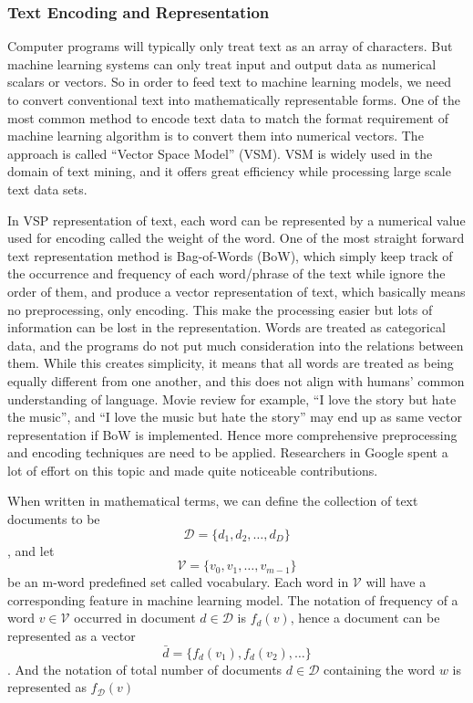 \documentclass[conference]{IEEEtran}
\begin{document}
\subsubsection{Text Encoding and Representation}
\label{model:represent:encoding}
    Computer programs will typically only treat text as an array of characters.
    But machine learning systems can only treat input and output data as numerical
    scalars or vectors. So in order to feed text to machine learning models, we need to 
    convert conventional text into mathematically representable forms. One of the most
    common method to encode text data to match the format requirement of machine
    learning algorithm is to convert them into numerical vectors. The approach is called
    ``Vector Space Model'' (VSM). VSM is widely used in the domain of text mining, and
    it offers great efficiency while processing large scale text data 
    sets\cite{salton1975vector,hotho2005brief}.
    
    In VSP representation of text, each word can be represented by a numerical value 
    used for encoding called the weight of the word. 
    One of the most straight forward text representation method is Bag-of-Words (BoW), 
    which simply keep track of the occurrence and frequency of each word/phrase of the text 
    while ignore the order of them, and produce a vector representation of text, which 
    basically means no preprocessing, only encoding. 
    This make the processing easier but lots of information can be lost in the 
    representation. 
    Words are treated as categorical data, and the programs do not put much consideration
    into the relations between them. While this creates simplicity, it means that all 
    words are treated as being equally different from one another, and this does not 
    align with humans' common understanding of language. 
    Movie review for example, ``I love the story but hate the music'', 
    and ``I love the music but hate the story'' may end up as same vector representation
    if BoW is implemented. Hence more comprehensive preprocessing and encoding techniques
    are need to be applied.
    Researchers in Google spent a lot of effort on this topic and 
    made quite noticeable contributions\cite{mikolov2013efficient, word2vec}.
    
    When written in mathematical terms, we can define the collection of text documents
    to be $$\mathcal{D}=\{d_1, d_2,\ldots,d_D\}$$, and
    let $$\mathcal{V}=\{v_0, v_1,\ldots, v_{m-1}\}$$ be an m-word predefined set called
    vocabulary. Each word in $\mathcal{V}$ will have a corresponding feature in
    machine learning model. The notation of frequency of a word $v\in\mathcal{V}$ occurred 
    in document $d\in\mathcal{D}$ is $f_d(v)$, hence a document can be represented as
    a vector $$\bar{d}=\{f_d(v_1),f_d(v_2),\ldots\}$$.
    And the notation of total number of documents
    $d\in\mathcal{D}$ containing the word $w$ is represented as $f_\mathcal{D}(v)$
    
\end{document}
